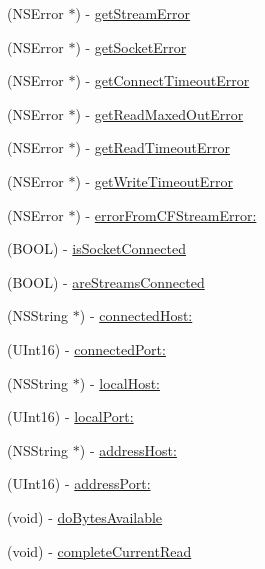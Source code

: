 \begin{DoxyCompactItemize}
\item 
(NSError $\ast$) -\/ \hyperlink{interface_async_t_c_p_socket_a197bac5011e90bdf2c20193d91281737}{getStreamError}
\item 
(NSError $\ast$) -\/ \hyperlink{interface_async_t_c_p_socket_a9b0a42080e950dde8de512e46e067443}{getSocketError}
\item 
(NSError $\ast$) -\/ \hyperlink{interface_async_t_c_p_socket_a4a9dbc78736492d8b03ef1529d73dca3}{getConnectTimeoutError}
\item 
(NSError $\ast$) -\/ \hyperlink{interface_async_t_c_p_socket_a0e412578f825bc0dddd2f4a19b7207af}{getReadMaxedOutError}
\item 
(NSError $\ast$) -\/ \hyperlink{interface_async_t_c_p_socket_a4b3fc35f35afafea4998af7e66dd4c97}{getReadTimeoutError}
\item 
(NSError $\ast$) -\/ \hyperlink{interface_async_t_c_p_socket_a2e3b722527b1a23493e89815dcf284e6}{getWriteTimeoutError}
\item 
(NSError $\ast$) -\/ \hyperlink{interface_async_t_c_p_socket_a6a37c30b55a15065dd5053d6b926ace0}{errorFromCFStreamError:}
\item 
(BOOL) -\/ \hyperlink{interface_async_t_c_p_socket_ace6bc797c15b8e7a5ab60bc7acfc5c81}{isSocketConnected}
\item 
(BOOL) -\/ \hyperlink{interface_async_t_c_p_socket_a47274c3f9410ec0f91299553dd583260}{areStreamsConnected}
\item 
(NSString $\ast$) -\/ \hyperlink{interface_async_t_c_p_socket_a7a10cb2cb03eb0e06aea6bcb16f84a8b}{connectedHost:}
\item 
(UInt16) -\/ \hyperlink{interface_async_t_c_p_socket_a5910314780c573d73d483b466020a1ed}{connectedPort:}
\item 
(NSString $\ast$) -\/ \hyperlink{interface_async_t_c_p_socket_a59fe5c5c33e9e7dfa11ffc2bc4e18c38}{localHost:}
\item 
(UInt16) -\/ \hyperlink{interface_async_t_c_p_socket_a384db6eb52b78874c030bcd063046e76}{localPort:}
\item 
(NSString $\ast$) -\/ \hyperlink{interface_async_t_c_p_socket_a976fe345816349e2fe56497d85a3e9fa}{addressHost:}
\item 
(UInt16) -\/ \hyperlink{interface_async_t_c_p_socket_a25726245584a9fe11285fbcb6505a086}{addressPort:}
\item 
(void) -\/ \hyperlink{interface_async_t_c_p_socket_a3a3502a385aa9b445ef913e199c04298}{doBytesAvailable}
\item 
(void) -\/ \hyperlink{interface_async_t_c_p_socket_aff46e99a04ace9e7556da4a90155a7ab}{completeCurrentRead}

\end{DoxyCompactItemize}
